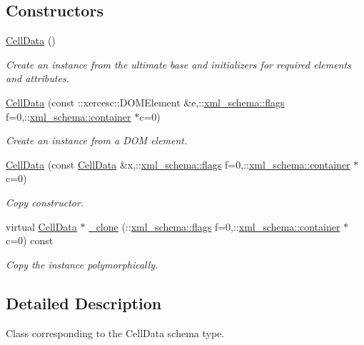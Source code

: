 \subsection*{Constructors}
\begin{DoxyCompactItemize}
\item 
\hyperlink{classCellData_a0d89ba23195659a1fcdc714fa27697a5}{Cell\+Data} ()
\begin{DoxyCompactList}\small\item\em Create an instance from the ultimate base and initializers for required elements and attributes. \end{DoxyCompactList}\item 
\hyperlink{classCellData_ac98b30101e2448016bfa96b9fa6ee18a}{Cell\+Data} (const \+::xercesc\+::\+D\+O\+M\+Element \&e,\+::\hyperlink{namespacexml__schema_a8d981c127a1f5106d04ad5853e707361}{xml\+\_\+schema\+::flags} f=0,\+::\hyperlink{namespacexml__schema_a395f5179c5fc4643909d66e9ff28d8ca}{xml\+\_\+schema\+::container} $\ast$c=0)
\begin{DoxyCompactList}\small\item\em Create an instance from a D\+O\+M element. \end{DoxyCompactList}\item 
\hyperlink{classCellData_ae93656ff9893f518c8f1cfdc611c8045}{Cell\+Data} (const \hyperlink{classCellData}{Cell\+Data} \&x,\+::\hyperlink{namespacexml__schema_a8d981c127a1f5106d04ad5853e707361}{xml\+\_\+schema\+::flags} f=0,\+::\hyperlink{namespacexml__schema_a395f5179c5fc4643909d66e9ff28d8ca}{xml\+\_\+schema\+::container} $\ast$c=0)
\begin{DoxyCompactList}\small\item\em Copy constructor. \end{DoxyCompactList}\item 
virtual \hyperlink{classCellData}{Cell\+Data} $\ast$ \hyperlink{classCellData_aa17c3a153b3a7692dca562878f3fe3ad}{\+\_\+clone} (\+::\hyperlink{namespacexml__schema_a8d981c127a1f5106d04ad5853e707361}{xml\+\_\+schema\+::flags} f=0,\+::\hyperlink{namespacexml__schema_a395f5179c5fc4643909d66e9ff28d8ca}{xml\+\_\+schema\+::container} $\ast$c=0) const 
\begin{DoxyCompactList}\small\item\em Copy the instance polymorphically. \end{DoxyCompactList}\end{DoxyCompactItemize}


\subsection{Detailed Description}
Class corresponding to the Cell\+Data schema type. 

